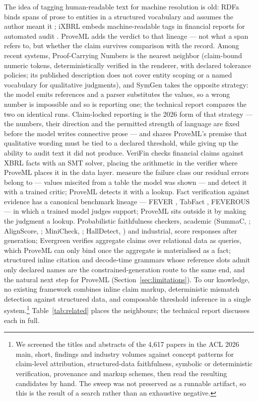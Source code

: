 \documentclass[11pt,a4paper]{article}
\begin{document}
The idea of tagging human-readable text for machine resolution is old: RDFa binds spans of prose to entities in a structured vocabulary and assumes the author meant it \citep{rdfa}; iXBRL embeds machine-readable tags in financial reports for automated audit \citep{ixbrl}. ProveML adds the verdict to that lineage --- not what a span refers to, but whether the claim survives comparison with the record. Among recent systems, Proof-Carrying Numbers \citep{pcn2025} is the nearest neighbor (claim-bound numeric tokens, deterministically verified in the renderer, with declared tolerance policies; its published description does not cover entity scoping or a named vocabulary for qualitative judgments), and SymGen \citep{symgen} takes the opposite strategy: the model emits references and a parser substitutes the values, so a wrong number is impossible and so is reporting one; the technical report compares the two on identical runs. Claim-locked reporting \citep{claimlocked2026} is the 2026 form of that strategy --- the numbers, their direction and the permitted strength of language are fixed before the model writes connective prose --- and shares ProveML's premise that qualitative wording must be tied to a declared threshold, while giving up the ability to audit text it did not produce. VeriFin \citep{verifin2026} checks financial claims against XBRL facts with an SMT solver, placing the arithmetic in the verifier where ProveML places it in the data layer. \citet{datareferencing2026} measure the failure class our residual errors belong to --- values miscited from a table the model was shown --- and detect it with a trained critic; ProveML detects it with a lookup. Fact verification against evidence has a canonical benchmark lineage --- FEVER \citep{fever}, TabFact \citep{tabfact}, FEVEROUS \citep{feverous} --- in which a trained model judges support; ProveML sits outside it by making the judgment a lookup. Probabilistic faithfulness checkers, academic (SummaC, \citealp{summac}; AlignScore, \citealp{alignscore}; MiniCheck, \citealp{minicheck}; HallDetect, \citealp{halldetect2026}) and industrial, score responses after generation; Evergreen \citep{evergreen2026} verifies aggregate claims over relational data as queries, which ProveML can only bind once the aggregate is materialised as a fact; structured inline citation \citep{fullcite2026} and decode-time grammars whose reference slots admit only declared names \citep{dtg2026} are the constrained-generation route to the same end, and the natural next step for ProveML (Section~\ref{sec:limitations}). To our knowledge, no existing framework combines inline claim markup, deterministic mismatch detection against structured data, and composable threshold inference in a single system.\footnote{We screened the titles and abstracts of the 4{,}617 papers in the ACL 2026 main, short, findings and industry volumes against concept patterns for claim-level attribution, structured-data faithfulness, symbolic or deterministic verification, provenance and markup schemes, then read the resulting candidates by hand. The sweep was not preserved as a runnable artifact, so this is the result of a search rather than an exhaustive negative.} Table~\ref{tab:related} places the neighbours; the technical report discusses each in full.
\end{document}
